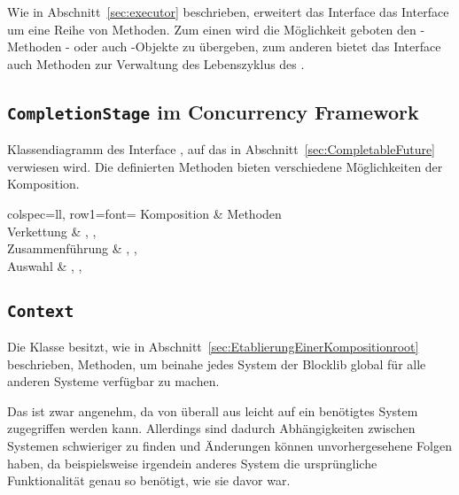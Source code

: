 Wie in Abschnitt~\vref{sec:executor} beschrieben, erweitert das Interface  das Interface  um eine Reihe von Methoden. Zum einen wird die Möglichkeit geboten den -Methoden - oder auch -Objekte zu übergeben, zum anderen bietet das Interface auch Methoden zur Verwaltung des Lebenszyklus des .

\clearpage
\subsection{\texttt{CompletionStage} im Concurrency Framework}\label{appendix:CompletionStage}


Klassendiagramm des Interface , auf das in Abschnitt~\vref{sec:CompletableFuture} verwiesen wird. Die definierten Methoden bieten verschiedene Möglichkeiten der Komposition.

\begin{tblr}{
	colspec={ll},
	row{1}={font=\bfseries}
	}
	Komposition & Methoden \\
	Verkettung & , , \\
	Zusammenführung & , ,  \\
	Auswahl & , ,  \\
\end{tblr}

\clearpage
\subsection{\texttt{Context}}\label{appendix:context}
{
	\centering
	
	\par
}
Die Klasse  besitzt, wie in Abschnitt~\vref{sec:EtablierungEinerKompositionroot} beschrieben, Methoden, um beinahe jedes System der Blocklib global für alle anderen Systeme verfügbar zu machen. 

Das ist zwar angenehm, da von überall aus leicht auf ein benötigtes System zugegriffen werden kann. Allerdings sind dadurch Abhängigkeiten zwischen Systemen schwieriger zu finden und Änderungen können unvorhergesehene Folgen haben, da beispielsweise irgendein anderes System die ursprüngliche Funktionalität genau so benötigt, wie sie davor war. 

